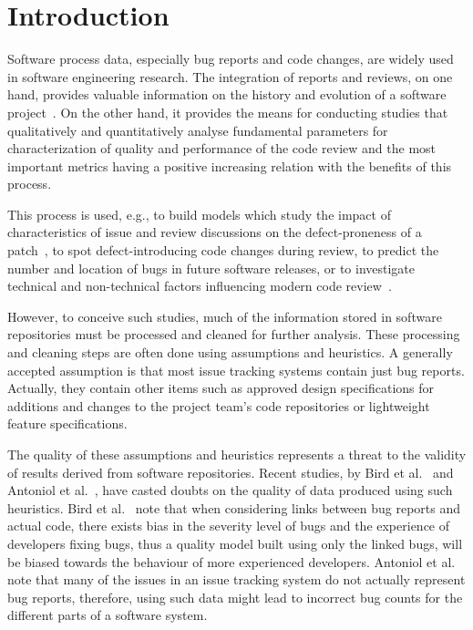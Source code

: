 \documentclass{llncs}
\begin{document}
\section{Introduction}
\label{sec:1}
Software process data, especially bug reports and code changes, are widely used in software engineering research. The
integration of reports and reviews, on one hand, provides valuable information on the history and evolution of a software project~\cite{con0}. 
On the other hand, it provides the means for conducting studies that qualitatively and quantitatively analyse fundamental parameters 
for characterization of quality and performance of the code review and the most important metrics having a positive increasing 
relation with the benefits of this process.

This process is used, e.g., to build models which study the impact of characteristics of issue and review discussions on the 
defect-proneness of a patch~\cite{con1}, to spot defect-introducing code changes during review, to predict the number and location 
of bugs in future software releases, or to investigate technical and non-technical 
factors influencing modern code review~\cite{con2,con3,con4,con5,con6}.

However, to conceive such studies, 
much of the information stored in software repositories
must be processed and cleaned for further analysis. These 
processing and cleaning steps are often done using assumptions 
and heuristics. A generally accepted assumption is that most issue
tracking systems contain just bug reports. Actually, 
they contain other items such as approved design specifications for 
additions and changes to the project team's code repositories or 
lightweight feature specifications.

The quality of these assumptions and heuristics represents a threat to 
the validity of results derived from software 
repositories. Recent studies, by Bird et al.~\cite{con7} and Antoniol et al.~\cite{con8}, have casted doubts on the quality of data produced
using such heuristics. 
Bird et al.~\cite{con7} note that when considering links between bug reports and actual 
code, there exists bias in the severity level of bugs and the experience of
developers fixing bugs, thus a quality model built using only the linked 
bugs, will be biased towards the behaviour of more experienced developers.
Antoniol et al.~\cite{con8} note that many of the issues in an issue tracking system do 
not actually represent bug reports, therefore, using such data might lead to 
incorrect bug counts for the different parts of a software system.
\end{document}
